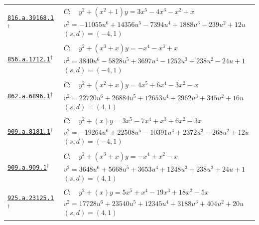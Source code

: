 \documentclass[10pt]{article}
\newcommand{\entryseparator}{\noalign{\vskip3pt\hbox to\linewidth{\leaders\hbox{\kern2pt\rule{3pt}{0.3pt}\kern2pt}\hfill}\nobreak\vskip3pt\nobreak}}
\begin{document}
\begin{landscape}
\begin{longtable}{@{}p{3.4cm}p{\dimexpr\linewidth-3.4cm-2\tabcolsep\relax}@{}}
\entryseparator
\href{https://www.lmfdb.org/Genus2Curve/Q/816/a/39168/1}{\texttt{816.a.39168.1}}$^{\dagger}$ & $\begin{gathered}C:\quad y^2+\left(x^{2} + 1\right)y=3 x^{5} - 4 x^{3} - x^{2} + x\\v^2=-11055 u^{6} + 14356 u^{5} - 7394 u^{4} + 1888 u^{3} - 239 u^{2} + 12 u\\(s,d)=(-4,1)\end{gathered}$ \\
\entryseparator
\href{https://www.lmfdb.org/Genus2Curve/Q/856/a/1712/1}{\texttt{856.a.1712.1}}$^{\dagger}$ & $\begin{gathered}C:\quad y^2+\left(x^{3} + x\right)y=-x^{4} - x^{3} + x\\v^2=3840 u^{6} - 5828 u^{5} + 3697 u^{4} - 1252 u^{3} + 238 u^{2} - 24 u + 1\\(s,d)=(-4,1)\end{gathered}$ \\
\entryseparator
\href{https://www.lmfdb.org/Genus2Curve/Q/862/a/6896/1}{\texttt{862.a.6896.1}}$^{\dagger}$ & $\begin{gathered}C:\quad y^2+\left(x^{2} + x\right)y=4 x^{5} + 6 x^{4} - 3 x^{2} - x\\v^2=22720 u^{6} + 26884 u^{5} + 12653 u^{4} + 2962 u^{3} + 345 u^{2} + 16 u\\(s,d)=(4,1)\end{gathered}$ \\
\entryseparator
\href{https://www.lmfdb.org/Genus2Curve/Q/909/a/8181/1}{\texttt{909.a.8181.1}}$^{\dagger}$ & $\begin{gathered}C:\quad y^2+\left(x\right)y=3 x^{5} - 7 x^{4} + x^{3} + 6 x^{2} - 3 x\\v^2=-19264 u^{6} + 22508 u^{5} - 10391 u^{4} + 2372 u^{3} - 268 u^{2} + 12 u\\(s,d)=(-4,1)\end{gathered}$ \\
\entryseparator
\href{https://www.lmfdb.org/Genus2Curve/Q/909/a/909/1}{\texttt{909.a.909.1}}$^{\dagger}$ & $\begin{gathered}C:\quad y^2+\left(x^{3} + x\right)y=-x^{4} + x^{2} - x\\v^2=3648 u^{6} + 5668 u^{5} + 3653 u^{4} + 1248 u^{3} + 238 u^{2} + 24 u + 1\\(s,d)=(4,1)\end{gathered}$ \\
\entryseparator
\href{https://www.lmfdb.org/Genus2Curve/Q/925/a/23125/1}{\texttt{925.a.23125.1}}$^{\dagger}$ & $\begin{gathered}C:\quad y^2+\left(x\right)y=5 x^{5} + x^{4} - 19 x^{3} + 18 x^{2} - 5 x\\v^2=17728 u^{6} + 23540 u^{5} + 12345 u^{4} + 3188 u^{3} + 404 u^{2} + 20 u\\(s,d)=(4,1)\end{gathered}$ \\

\end{longtable}
\end{landscape}
\end{document}

